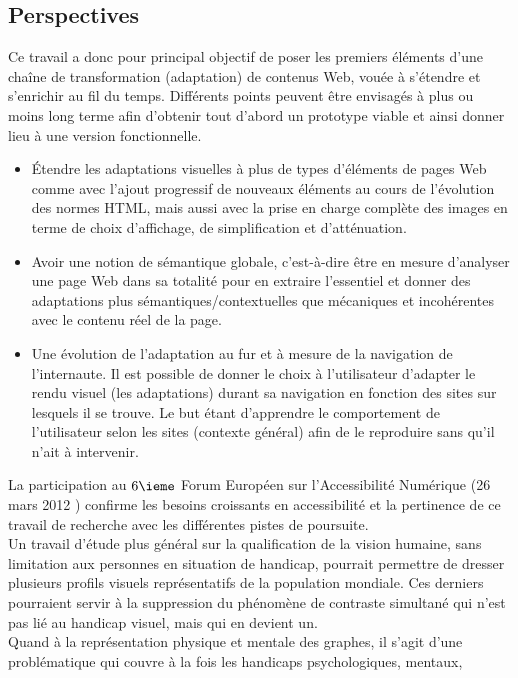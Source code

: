 \documentclass[french,a4paper]{report}
\begin{document}
{\subsection{Perspectives}
Ce travail a donc pour principal objectif de poser les premiers éléments d'une
chaîne de transformation (adaptation) de contenus Web, vouée à s'étendre et
s'enrichir au fil du temps. Différents points peuvent être envisagés à plus ou
moins long terme afin d'obtenir tout d'abord un prototype viable et ainsi donner
lieu à une version fonctionnelle.
\begin{itemize}\setlength{\itemsep}{0.4\baselineskip}
\item Étendre les adaptations visuelles à plus de types d'éléments de pages Web
comme avec l'ajout progressif de nouveaux éléments au cours de l'évolution des
normes HTML, mais aussi avec la prise en charge complète des images en terme
de choix d'affichage, de simplification et d'atténuation.
\item Avoir une notion de sémantique globale, c'est-à-dire être en mesure
d'analyser une page Web dans sa totalité pour en extraire l'essentiel et
donner des adaptations plus sémantiques/contextuelles que mécaniques et
incohérentes avec le contenu réel de la page.
\item Une évolution de l'adaptation au fur et à mesure de la navigation de
l'internaute. Il est possible de donner le choix à l'utilisateur d'adapter le
rendu visuel (les adaptations) durant sa navigation en fonction des sites sur
lesquels il se trouve. Le but étant d'apprendre le comportement de
l'utilisateur selon les sites (contexte général) afin de le reproduire
sans qu'il n'ait à intervenir.\\
\end{itemize}
La participation au $6\ieme$ Forum Européen sur l'Accessibilité Numérique (26
mars 2012 \cite{FEAN}) confirme les besoins croissants en accessibilité et la
pertinence de ce travail de recherche avec les différentes pistes de poursuite.\\
Un travail d'étude plus général sur la qualification de la vision humaine, sans
limitation aux personnes en situation de handicap, pourrait permettre de dresser
plusieurs profils visuels représentatifs de la population mondiale. Ces derniers
pourraient servir à la suppression du phénomène de contraste simultané qui n'est
pas lié au handicap visuel, mais qui en devient un.\\
Quand à la représentation physique et mentale des graphes, il s'agit d'une
problématique qui couvre à la fois les handicaps psychologiques, mentaux,
}
\end{document}
